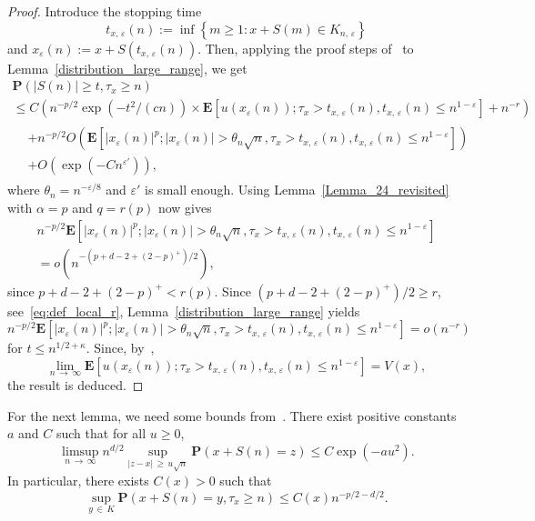 \documentclass[AHL,Unicode,longabstracts,published]{cedram}
\newcommand{\pr}{\mathbf{P}}
\newcommand{\e}{\mathbf{E}}
\renewcommand{\epsilon}{\varepsilon}
\renewcommand{\leq}{\leqslant}
\renewcommand{\geq}{\geqslant}
\begin{document}
\begin{proof}
Introduce the stopping time
\begin{equation}\label{eq:t_x}
t_{x,\,\epsilon}(n):=\inf\left\{m\geq 1:x+S(m)\in {K}_{n,\,\epsilon}\right\}
\end{equation}
and $x_{\epsilon}(n):=x+S(t_{x,\,\epsilon}(n))$. Then, applying the proof steps of~\cite[Section~4]{DeWa-15} to Lemma~\ref{distribution_large_range}, we get
\begin{multline*}
\pr\left(|S(n)| \geq t, \tau_{x}\geq n\right)\\
\leq C\left(n^{-p/2}\exp\left(-t^{2}/(cn)\right)\times
\e\left[u\left(x_{\epsilon}(n)\right);\tau_{x}>t_{x,\,\epsilon}(n),t_{x,\,\epsilon}(n)\leq n^{1-\epsilon}\right]+ n^{-r}\right)\\
\begin{aligned}
&+n^{-p/2}O\left(\e\left[\left|x_{\epsilon}(n)\right|^{p};\left|x_{\epsilon}(n)\right|> \theta_{n}\sqrt{n},\tau_{x}>t_{x,\,\epsilon}(n),t_{x,\,\epsilon}(n)\leq n^{1-\epsilon}\right]\right)\\
&+O\left(\exp\left(-Cn^{\epsilon'}\right)\right),
\end{aligned}
\end{multline*}
where $\theta_{n}=n^{-\epsilon/8}$ and $\epsilon'$ is small enough. Using Lemma~\ref{Lemma_24_revisited} with $\alpha=p$ and $q=r(p)$ now gives
\begin{multline*}
n^{-p/2} \e\left[\left|x_{\epsilon}(n)\right|^{p};\left|x_{\epsilon}(n)\right|> \theta_{n}\sqrt{n},\tau_{x}>t_{x,\,\epsilon}(n),t_{x,\,\epsilon}(n)\leq n^{1-\epsilon}\right]\\
=o\left(n^{-\left(p+d-2+(2-p)^{+}\right)/2}\right),
\end{multline*}
since $p+d-2+(2-p)^{+}<r(p)$. Since $(p+d-2+(2-p)^{+})/2\geq r$, see~\eqref{eq:def_local_r}, Lemma~\ref{distribution_large_range} yields
\[
n^{-p/2}\e\left[\left|x_{\epsilon}(n)\right|^{p};\left|x_{\epsilon}(n)\right|> \theta_{n}\sqrt{n},\tau_{x}>t_{x,\,\epsilon}(n),t_{x,\,\epsilon}(n)\leq n^{1-\epsilon}\right]=o\left(n^{-r}\right)
\]
for $t\leq n^{1/2+\kappa}$. Since, by~\cite[Lemma~21]{DeWa-15},
\[
\lim_{n\,\rightarrow\,\infty}\e\left[u\left(x_{\epsilon}(n)\right);\tau_{x}>t_{x,\,\epsilon}(n),t_{x,\,\epsilon}(n)\leq n^{1-\epsilon}\right]=V(x),
\]
the result is deduced.
\end{proof}

For the next lemma, we need some bounds from~\cite[Lemmas~27 and~29]{DeWa-15}. There exist positive constants $a$ and $C$ such that for all $u\geq 0$,
\begin{equation}\label{bound_local_probability}
\limsup_{n\,\rightarrow\,\infty} n^{d/2}\sup_{|z-x|\,\geq\,u\sqrt{n}}\pr\left(x+S(n)=z\right)\leq C\exp\left(-au^{2}\right).
\end{equation}
In particular, there exists $C(x)>0$ such that
\begin{equation}\label{bound_local_probability_in_cone}
\sup_{y\,\in\,{K}}\pr\left(x+S(n)=y,\tau_{x}\geq n\right)\leq C(x)n^{-p/2-d/2}.
\end{equation}
\end{document}
